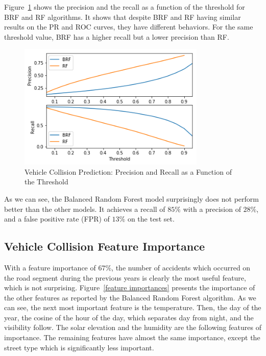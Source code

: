 \documentclass[conference]{IEEEtran}
\begin{document}
Figure~\ref{fig:pr-threshold} shows the precision and the recall as a function of the threshold for BRF and RF algorithms.
It shows that despite BRF and RF having similar results on the PR and ROC curves, they have different behaviors. For the same threshold value, BRF has a higher recall but a lower precision than RF.

\begin{figure}[htbp]
\centerline{\includegraphics[height=6cm, keepaspectratio]{Figures/pr_threshold.png}}
\caption{Vehicle Collision Prediction: Precision and Recall as a Function of the Threshold}
\label{fig:pr-threshold}
\end{figure}

As we can see, the Balanced Random Forest model surprisingly does not perform better than the other models.
It achieves a recall of $85\%$ with a precision of $28\%$, and a false positive rate (FPR) of $13\%$ on the test set.


\subsection{Vehicle Collision Feature Importance}

With a
feature importance of $67\%$, the number of accidents which occurred on the
road segment during the previous years is clearly the most useful feature, which
is not surprising. Figure~\ref{feature importances} presents the
importance of the other features as reported by the Balanced Random Forest
algorithm. As we can see, the next most important feature is the temperature. 
Then, the day of the year, the cosine of the hour of the day, which separates day from night,
and the visibility follow. The solar elevation and the humidity are 
the following features of importance. The remaining features have almost
the same importance, except the street type which
is significantly less important.
\end{document}
